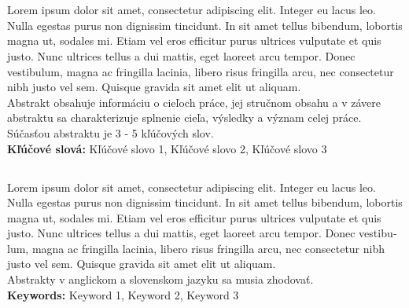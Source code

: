 \makeatletter
\renewenvironment{abstract}{
    \if@twocolumn
        \section*{\abstractname}%
    \else
        \normalfont\small
        \begin{flushleft} %
            {\bfseries \abstractname\par}%
        \end{flushleft}%
        \noindent\raggedright
    \fi
}
{
    \if@twocolumn\else\par\fi
}
\makeatother

\begin{abstract}

    Lorem ipsum dolor sit amet, consectetur adipiscing elit. Integer eu lacus leo. Nulla egestas purus non dignissim tincidunt. In sit amet tellus bibendum, lobortis magna ut, sodales mi. Etiam vel eros efficitur purus ultrices vulputate et quis justo. Nunc ultrices tellus a dui mattis, eget laoreet arcu tempor. Donec vestibulum, magna ac fringilla lacinia, libero risus fringilla arcu, nec consectetur nibh justo vel sem. Quisque gravida sit amet elit ut aliquam.\\
    \hfill \break
    Abstrakt obsahuje informáciu o cieľoch práce, jej stručnom obsahu a v závere abstraktu sa charakterizuje splnenie cieľa, výsledky a význam celej práce. Súčasťou abstraktu je 3 - 5 kľúčových slov.
\vspace{1em}\\
\textbf{Kľúčové slová:} Kľúčové slovo 1, Kľúčové slovo 2, Kľúčové slovo 3

\end{abstract}
\pagebreak
\begin{otherlanguage}{english}
\begin{abstract}

    Lorem ipsum dolor sit amet, consectetur adipiscing elit. Integer eu lacus leo. Nulla egestas purus non dignissim tincidunt. In sit amet tellus bibendum, lobortis magna ut, sodales mi. Etiam vel eros efficitur purus ultrices vulputate et quis justo. Nunc ultrices tellus a dui mattis, eget laoreet arcu tempor. Donec vestibulum, magna ac fringilla lacinia, libero risus fringilla arcu, nec consectetur nibh justo vel sem. Quisque gravida sit amet elit ut aliquam.\\ 
    \hfill \break
    Abstrakty v anglickom a slovenskom jazyku sa musia zhodovať.
\vspace{1em}\\
\textbf{Keywords:} Keyword 1, Keyword 2, Keyword 3
\end{abstract}
\end{otherlanguage}